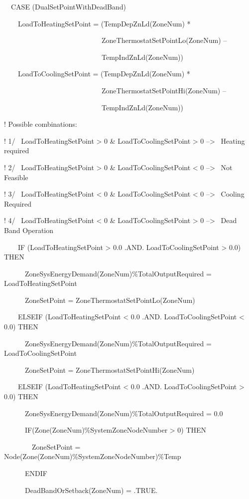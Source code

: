 ~~CASE (DualSetPointWithDeadBand)

~~~~LoadToHeatingSetPoint = (TempDepZnLd(ZoneNum) *

~~~~~~~~~~~~~~~~~~~~~~~~~~~~ZoneThermostatSetPointLo(ZoneNum) --

~~~~~~~~~~~~~~~~~~~~~~~~~~~~TempIndZnLd(ZoneNum))

~~~~LoadToCoolingSetPoint = (TempDepZnLd(ZoneNum) *

~~~~~~~~~~~~~~~~~~~~~~~~~~~~ZoneThermostatSetPointHi(ZoneNum) --

~~~~~~~~~~~~~~~~~~~~~~~~~~~~TempIndZnLd(ZoneNum))

! Possible combinations:

! 1/~ LoadToHeatingSetPoint \textgreater{} 0 \& LoadToCoolingSetPoint \textgreater{} 0 --\textgreater{}~ Heating required

! 2/~ LoadToHeatingSetPoint \textgreater{} 0 \& LoadToCoolingSetPoint \textless{} 0 --\textgreater{}~ Not Feasible

! 3/~ LoadToHeatingSetPoint \textless{} 0 \& LoadToCoolingSetPoint \textless{} 0 --\textgreater{}~ Cooling Required

! 4/~ LoadToHeatingSetPoint \textless{} 0 \& LoadToCoolingSetPoint \textgreater{} 0 --\textgreater{}~ Dead Band Operation

~~~~IF (LoadToHeatingSetPoint \textgreater{} 0.0 .AND. LoadToCoolingSetPoint \textgreater{} 0.0) THEN

~~~~~~ZoneSysEnergyDemand(ZoneNum)\%TotalOutputRequired = LoadToHeatingSetPoint

~~~~~~ZoneSetPoint = ZoneThermostatSetPointLo(ZoneNum)

~~~~ELSEIF (LoadToHeatingSetPoint \textless{} 0.0 .AND. LoadToCoolingSetPoint \textless{} 0.0) THEN

~~~~~~ZoneSysEnergyDemand(ZoneNum)\%TotalOutputRequired = LoadToCoolingSetPoint

~~~~~~ZoneSetPoint = ZoneThermostatSetPointHi(ZoneNum)

~~~~ELSEIF (LoadToHeatingSetPoint \textless{} 0.0 .AND. LoadToCoolingSetPoint \textgreater{} 0.0) THEN

~~~~~~ZoneSysEnergyDemand(ZoneNum)\%TotalOutputRequired = 0.0

~~~~~~IF(Zone(ZoneNum)\%SystemZoneNodeNumber \textgreater{} 0) THEN

~~~~~~~~ZoneSetPoint = Node(Zone(ZoneNum)\%SystemZoneNodeNumber)\%Temp

~~~~~~ENDIF

~~~~~~DeadBandOrSetback(ZoneNum) = .TRUE.

